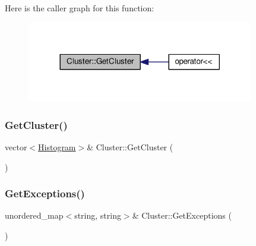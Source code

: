 Here is the caller graph for this function\+:
\nopagebreak
\begin{figure}[H]
\begin{center}
\leavevmode
\includegraphics[width=281pt]{class_cluster_aa890420aa5906859751f7920dc5b30d0_icgraph}
\end{center}
\end{figure}
\mbox{\label{class_cluster_a9c667ad971afdc00ffd2cb83611dabde}} 
\subsubsection{\texorpdfstring{Get\+Cluster()}{GetCluster()}\hspace{0.1cm}{\footnotesize\ttfamily [2/2]}}
{\footnotesize\ttfamily vector$<$\hyperlink{class_histogram}{Histogram}$>$\& Cluster\+::\+Get\+Cluster (\begin{DoxyParamCaption}{ }\end{DoxyParamCaption})\hspace{0.3cm}{\ttfamily [inline]}}

\mbox{\label{class_cluster_ae703b09c81c25ab89bde18ca09aa1a5d}} 
\subsubsection{\texorpdfstring{Get\+Exceptions()}{GetExceptions()}}
{\footnotesize\ttfamily unordered\+\_\+map$<$string, string$>$\& Cluster\+::\+Get\+Exceptions (\begin{DoxyParamCaption}{ }\end{DoxyParamCaption})\hspace{0.3cm}{\ttfamily [inline]}}

\mbox{\label{class_cluster_ada4f897af1294c97e3ff2f8023a92b55}} 
